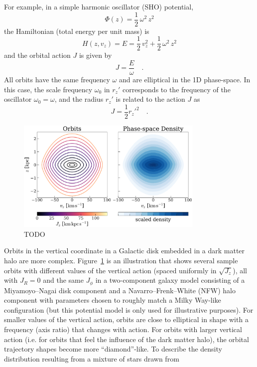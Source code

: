 For example, in a simple harmonic oscillator (SHO) potential,
\begin{equation}
    \Phi(z) = \frac{1}{2} \, \omega^2 \, z^2
\end{equation}
the Hamiltonian (total energy per unit mass) is
\begin{equation}
    H(z, v_z) = E = \frac{1}{2} \, v_z^2 + \frac{1}{2} \, \omega^2 \,z^2
\end{equation}
and the orbital action $J$ is given by
\begin{equation}
    J = \frac{E}{\omega} \quad .
\end{equation}
All orbits have the same frequency $\omega$ and are elliptical in the 1D phase-space.
In this case, the scale frequency $\omega_0$ in $r_z'$ corresponds to the frequency of
the oscillator $\omega_0=\omega$, and the radius $r_z'$ is related to the action $J$ as
\begin{equation}
    J = \frac{1}{2} r_z'^2 \quad .
\end{equation}

\begin{figure}[!t]
\begin{center}
\includegraphics[width=0.8\textwidth]{illustrate-zvz.pdf}
\end{center}
\caption{%
TODO
\label{fig:zvz}
}
\end{figure}

Orbits in the vertical coordinate in a Galactic disk embedded in a dark matter halo are
more complex.
Figure~\ref{fig:zvz} is an illustration that shows several sample orbits with different
values of the vertical action (spaced uniformly in $\sqrt{J_z}$), all with $J_R=0$ and
the same $J_\phi$ in a two-component galaxy model consisting of a Miyamoyo--Nagai disk
component \citep{Miyamoto:1975} and a Navarro--Frenk--White (NFW) halo component
\citep{NFW:1996} with parameters chosen to roughly match a Milky Way-like configuration
(but this potential model is only used for illustrative purposes).
For smaller values of the vertical action, orbits are close to elliptical in shape with
a frequency (axis ratio) that changes with action.
For orbits with larger vertical action (i.e. for orbits that feel the influence of the
dark matter halo), the orbital trajectory shapes become more ``diamond''-like.
To describe the density distribution resulting from a mixture of stars drawn from




